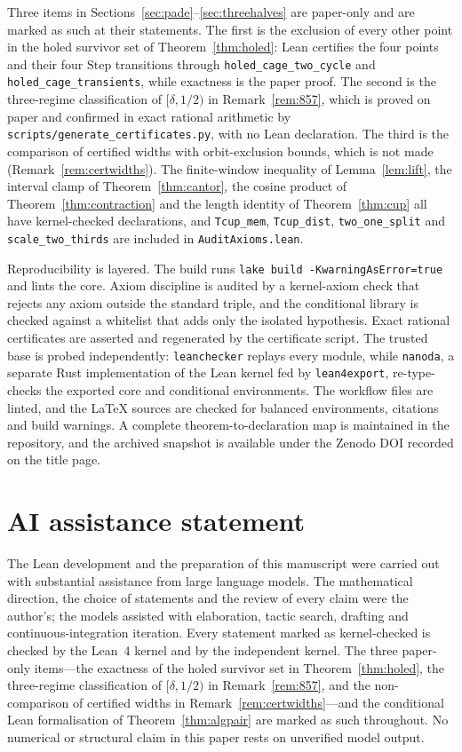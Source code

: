 \documentclass[11pt,a4paper]{article}
\theoremstyle{remark}
\begin{document}
Three items in Sections~\ref{sec:pade}--\ref{sec:threehalves} are paper-only and are marked as such at their statements. The first is the exclusion of every other point in the holed survivor set of Theorem~\ref{thm:holed}: Lean certifies the four points and their four $\mathrm{Step}$ transitions through \texttt{holed\_cage\_two\_cycle} and \texttt{holed\_cage\_transients}, while exactness is the paper proof. The second is the three-regime classification of $[\delta,1/2)$ in Remark~\ref{rem:857}, which is proved on paper and confirmed in exact rational arithmetic by \texttt{scripts/generate\_certificates.py}, with no Lean declaration. The third is the comparison of certified widths with orbit-exclusion bounds, which is not made (Remark~\ref{rem:certwidths}). The finite-window inequality of Lemma~\ref{lem:lift}, the interval clamp of Theorem~\ref{thm:cantor}, the cosine product of Theorem~\ref{thm:contraction} and the length identity of Theorem~\ref{thm:cup} all have kernel-checked declarations, and \texttt{Tcup\_mem}, \texttt{Tcup\_dist}, \texttt{two\_one\_split} and \texttt{scale\_two\_thirds} are included in \texttt{AuditAxioms.lean}.

Reproducibility is layered. The build runs \texttt{lake build -KwarningAsError=true} and lints the core. Axiom discipline is audited by a kernel-axiom check that rejects any axiom outside the standard triple, and the conditional library is checked against a whitelist that adds only the isolated hypothesis. Exact rational certificates are asserted and regenerated by the certificate script. The trusted base is probed independently: \texttt{leanchecker} replays every module, while \texttt{nanoda}, a separate Rust implementation of the Lean kernel fed by \texttt{lean4export}, re-type-checks the exported core and conditional environments. The workflow files are linted, and the LaTeX sources are checked for balanced environments, citations and build warnings. A complete theorem-to-declaration map is maintained in the repository, and the archived snapshot is available under the Zenodo DOI recorded on the title page.

\section{AI assistance statement}
\label{sec:ai}

The Lean development and the preparation of this manuscript were carried out with substantial assistance from large language models. The mathematical direction, the choice of statements and the review of every claim were the author's; the models assisted with elaboration, tactic search, drafting and continuous-integration iteration. Every statement marked as kernel-checked is checked by the Lean~4 kernel and by the independent kernel. The three paper-only items---the exactness of the holed survivor set in Theorem~\ref{thm:holed}, the three-regime classification of $[\delta,1/2)$ in Remark~\ref{rem:857}, and the non-comparison of certified widths in Remark~\ref{rem:certwidths}---and the conditional Lean formalisation of Theorem~\ref{thm:algpair} are marked as such throughout. No numerical or structural claim in this paper rests on unverified model output.


\end{document}
